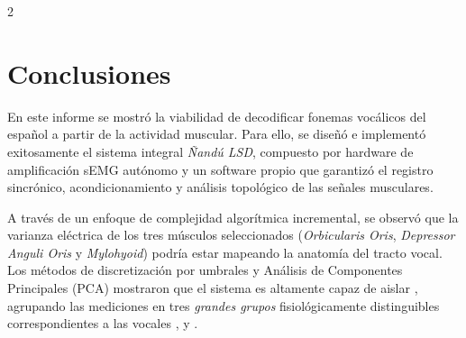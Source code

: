 \documentclass[11pt, letterpaper]{article}
\begin{document}
\begin{multicols*}{2}
    
    



\section{Conclusiones}

En este informe se mostró la viabilidad de decodificar fonemas vocálicos del español a partir de la actividad muscular.
Para ello, se diseñó e implementó exitosamente el sistema integral \textit{Ñandú LSD}, compuesto por hardware de amplificación sEMG autónomo y un software propio que garantizó el registro sincrónico, acondicionamiento y análisis topológico de las señales musculares.

A través de un enfoque de complejidad algorítmica incremental, se observó que la varianza eléctrica de los tres músculos seleccionados (\textit{Orbicularis Oris}, \textit{Depressor Anguli Oris} y \textit{Mylohyoid}) podría estar mapeando la anatomía del tracto vocal. Los métodos de discretización por umbrales y Análisis de Componentes Principales (PCA) mostraron que el sistema es altamente capaz de aislar , agrupando las mediciones en tres \textit{grandes grupos} fisiológicamente distinguibles correspondientes a las vocales ,  y .


\end{multicols*}
\end{document}
